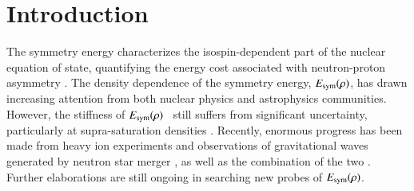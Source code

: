 \documentclass[twocolumn,twoside,showpacs,showkeys,preprintnumbers,superscriptaddress,amsmath,amssymb,prc,nofootinbib,a4paper]{revtex4}
\def\esym{$E_{\rm sym}(\rho)$}
\begin{document}

 \maketitle
 
\section{Introduction} 




The symmetry energy characterizes the isospin-dependent part of the nuclear equation of state, quantifying the energy cost associated with neutron-proton asymmetry \cite{li2008recent,danielewicz2002determination,Li2021}. The density dependence of the symmetry energy, \esym, has drawn increasing attention from both nuclear physics and astrophysics communities. However, the stiffness of \esym~ still suffers from significant uncertainty, particularly at supra-saturation densities \cite{Li:2019xxz}. Recently, enormous progress has been made from heavy ion experiments \cite{Tsang:2004zz,SpiRIT:2021gtq,Xiao:2008vm,Zhang:2017xtk} and observations of gravitational waves generated by neutron star merger \cite{LIGOScientific:2017vwq,LIGOScientific:2018cki}, as well as the combination of the two \cite{Tsang:2023vhh,Huth:2021bsp}. Further elaborations are still ongoing in searching new probes of \esym \cite{Wang:2021mrv,Wang:2022ysq,Wang:2023kyp}.
\end{document}
